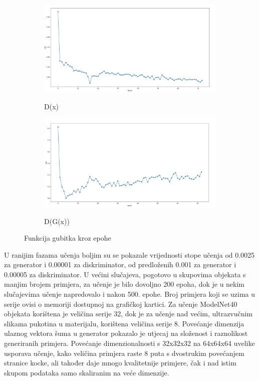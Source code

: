 \documentclass[times, utf8, diplomski]{fer}
\begin{document}
\begin{figure}[H]
\centering
\begin{subfigure}[b]{0.8\textwidth}
   \includegraphics[width=1\linewidth]{D(x).png}
   \label{fig:Ng1} 
    \caption{D(x)}
\end{subfigure}

\begin{subfigure}[b]{0.8\textwidth}
   \includegraphics[width=1\linewidth]{D(G(x)).png}
   \label{fig:Ng2}
   \caption{D(G(x))}
\end{subfigure}
\caption{Funkcija gubitka kroz epohe}
\end{figure}

\break

U ranijim fazama učenja boljim su se pokazale vrijednosti stope učenja od 0.0025 za generator i 0.00001 za diskriminator, od predloženih 0.001 za generator i 0.00005 za diskriminator. U većini slučajeva, pogotovo u skupovima objekata s manjim brojem primjera, za učenje je bilo dovoljno 200 epoha, dok je u nekim slučajevima učenje napredovalo i nakon 500. epohe. Broj primjera koji se uzima u serije ovisi o memoriji dostupnoj na grafičkoj kartici. Za učenje ModelNet40 objekata korištena je veličina serije 32, dok je za učenje nad većim, ultrazvučnim slikama pukotina u materijalu,  korištena veličina serije 8. Povećanje dimenzija ulaznog vektora šuma u generator pokazalo je utjecaj na složenost i raznolikost generiranih primjera. Povećanje dimenzionalnosti s 32x32x32 na 64x64x64 uvelike usporava učenje, kako veličina primjera raste 8 puta s dvostrukim povećanjem stranice kocke, ali također daje mnogo kvalitetnije primjere, čak i nad istim skupom podataka samo skaliranim na veće dimenzije.
\end{document}
